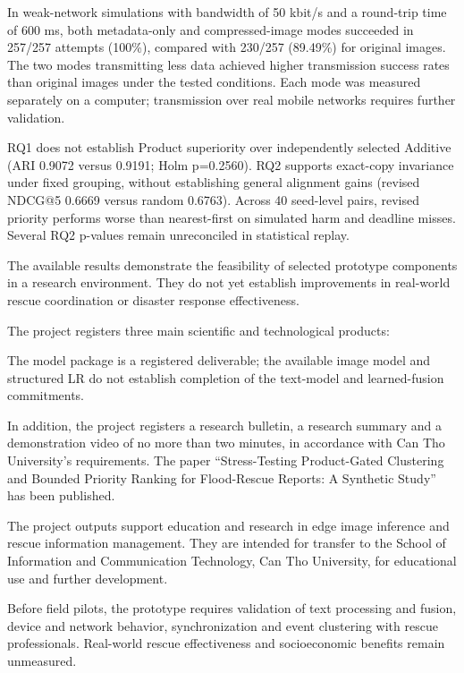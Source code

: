 In weak-network simulations with bandwidth of 50 kbit/s and a round-trip time of 600 ms, both metadata-only and compressed-image modes succeeded in 257/257 attempts (100\%), compared with 230/257 (89.49\%) for original images. The two modes transmitting less data achieved higher transmission success rates than original images under the tested conditions. Each mode was measured separately on a computer; transmission over real mobile networks requires further validation.

RQ1 does not establish Product superiority over independently selected Additive (ARI 0.9072 versus 0.9191; Holm p=0.2560). RQ2 supports exact-copy invariance under fixed grouping, without establishing general alignment gains (revised NDCG@5 0.6669 versus random 0.6763). Across 40 seed-level pairs, revised priority performs worse than nearest-first on simulated harm and deadline misses. Several RQ2 p-values remain unreconciled in statistical replay.

The available results demonstrate the feasibility of selected prototype components in a research environment. They do not yet establish improvements in real-world rescue coordination or disaster response effectiveness.

The project registers three main scientific and technological products:
\par\noindent The model package is a registered deliverable; the available image model and structured LR do not establish completion of the text-model and learned-fusion commitments.
\par\noindent In addition, the project registers a research bulletin, a research summary and a demonstration video of no more than two minutes, in accordance with Can Tho University's requirements. The paper ``Stress-Testing Product-Gated Clustering and Bounded Priority Ranking for Flood-Rescue Reports: A Synthetic Study'' has been published.

The project outputs support education and research in edge image inference and rescue information management. They are intended for transfer to the School of Information and Communication Technology, Can Tho University, for educational use and further development.

Before field pilots, the prototype requires validation of text processing and fusion, device and network behavior, synchronization and event clustering with rescue professionals. Real-world rescue effectiveness and socioeconomic benefits remain unmeasured.
